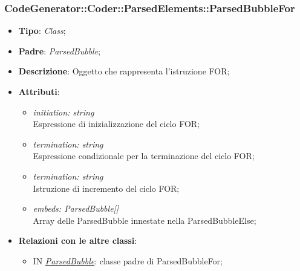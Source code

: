 \documentclass[../DefinizioneDiProdotto.tex]{subfiles}
\begin{document}
			\subsubsection{CodeGenerator::Coder::ParsedElements::ParsedBubbleFor}
			\hypertarget{SWEDesigner::Server::CodeGenerator::Coder::ParsedElements::ParsedBubbleFor}{}
			\begin{itemize}
				\item \textbf{Tipo}: \emph{Class};
				\item \textbf{Padre}: \emph{ParsedBubble};
				\item \textbf{Descrizione}: Oggetto che rappresenta l'istruzione FOR;
				\item \textbf{Attributi}:
				\begin{itemize}
					\item \emph{initiation: string} \\
					Espressione di inizializzazione del ciclo FOR;
					\item \emph{termination: string} \\
					Espressione condizionale per la terminazione del ciclo FOR;
					\item \emph{termination: string} \\
					Istruzione di incremento del ciclo FOR;
					\item \emph{embeds: ParsedBubble[]} \\
					Array delle ParsedBubble innestate nella ParsedBubbleElse;
				\end{itemize}
				\item \textbf{Relazioni con le altre classi}:	
				\begin{itemize}
					\item IN \hyperlink{SWEDesigner::Server::CodeGenerator::Coder::ParsedElements::ParsedBubble}{\emph{ParsedBubble}}: classe padre di ParsedBubbleFor; 
				\end{itemize}
			\end{itemize}
			
\end{document}
